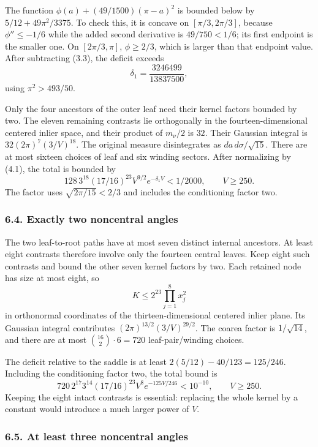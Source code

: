 \documentclass[
  11pt,
]{article}
\begin{document}
The function \(\phi(a)+(49/1500)(\pi-a)^2\) is bounded below by
\(5/12+49\pi^2/3375\). To check this, it is concave on
\([\pi/3,2\pi/3]\), because \(\phi''\le-1/6\) while the added second
derivative is \(49/750<1/6\); its first endpoint is the smaller one. On
\([2\pi/3,\pi]\), \(\phi\ge2/3\), which is larger than that endpoint
value. After subtracting (3.3), the deficit exceeds \[
 \delta_1=\frac{3246499}{13837500},                            \tag{6.3}
\] using \(\pi^2>493/50\).

Only the four ancestors of the outer leaf need their kernel factors
bounded by two. The eleven remaining contrasts lie orthogonally in the
fourteen-dimensional centered inlier space, and their product of
\(m_\nu/2\) is \(32\). Their Gaussian integral is
\(32(2\pi)^7(3/V)^{18}\). The original measure disintegrates as
\(da\,d\sigma/\sqrt{15}\). There are at most sixteen choices of leaf and
six winding sectors. After normalizing by (4.1), the total is bounded by
\[
 128\,3^{18}(17/16)^{23}V^{9/2}e^{-\delta_1V}<1/2000,
 \qquad V\ge250.                                             \tag{6.4}
\] The factor uses \(\sqrt{2\pi/15}<2/3\) and includes the conditioning
factor two.

\subsubsection{6.4. Exactly two noncentral
angles}\label{exactly-two-noncentral-angles}

The two leaf-to-root paths have at most seven distinct internal
ancestors. At least eight contrasts therefore involve only the fourteen
central leaves. Keep eight such contrasts and bound the other seven
kernel factors by two. Each retained node has size at most eight, so \[
 K\le2^{23}\prod_{j=1}^8x_j^2
\] in orthonormal coordinates of the thirteen-dimensional centered
inlier plane. Its Gaussian integral contributes
\((2\pi)^{13/2}(3/V)^{29/2}\). The coarea factor is \(1/\sqrt{14}\), and
there are at most \(\binom{16}{2}\cdot6=720\) leaf-pair/winding choices.

The deficit relative to the saddle is at least
\(2(5/12)-40/123=125/246\). Including the conditioning factor two, the
total bound is \[
 720\,2^{17}3^{14}(17/16)^{23}V^8e^{-125V/246}<10^{-10},
 \qquad V\ge250.                                             \tag{6.5}
\] Keeping the eight intact contrasts is essential: replacing the whole
kernel by a constant would introduce a much larger power of \(V\).

\subsubsection{6.5. At least three noncentral
angles}\label{at-least-three-noncentral-angles}
\end{document}
